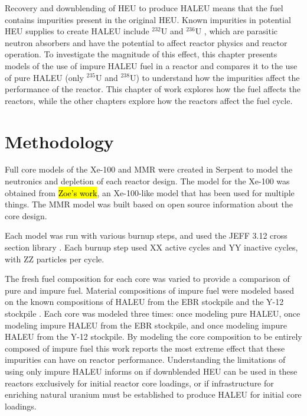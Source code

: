 Recovery and downblending of \gls{HEU} to produce \gls{HALEU} means that 
the fuel contains impurities present in the original
\gls{HEU}. Known impurities in potential \gls{HEU}
supplies to create \gls{HALEU} include $^{232}$U and $^{236}$U
\cite{vaden_isotopic_2018,nelson_foreign_2010},  
which are parasitic neutron absorbers and have the potential to affect 
reactor physics and reactor operation. To investigate the magnitude of this 
effect, this chapter presents models of the use of 
impure \gls{HALEU} fuel in a reactor and compares it to the use of pure 
\gls{HALEU} (only $^{235}$U and $^{238}$U)
to understand how the impurities affect the performance of the reactor.
This chapter of work explores how the fuel affects the reactors, while 
the other chapters explore how the reactors affect the fuel cycle. 

\section{Methodology}
Full core models of the Xe-100 and \gls{MMR} were created in Serpent 
\cite{leppanen_serpent_2014} to model the neutronics and depletion of 
each reactor design. The model for the Xe-100 was obtained from 
\hl{Zoe's work}, an Xe-100-like model that has been used for multiple 
things. The \gls{MMR} model was built based on open source information 
about the core design. 

Each model was run with various burnup steps, and used the JEFF 3.12 
cross section library \cite{koning_status_2011}. Each burnup step 
used XX active cycles and YY inactive cycles, with ZZ particles per 
cycle. 




The fresh fuel composition for each core was varied to provide 
a comparison of pure and impure fuel.
Material compositions of impure fuel were modeled based on the 
known compositions of \gls{HALEU} from the \gls{EBR} stockpile 
\cite{vaden_isotopic_2018} and the Y-12 stockpile \cite{nelson_foreign_2010}.
Each core was modeled three times: once modeling pure \gls{HALEU}, 
once modeling impure \gls{HALEU} from the \gls{EBR} stockpile, and once 
modeling impure \gls{HALEU} from the Y-12 stockpile.
By modeling the core composition to be entirely composed of impure fuel 
this work reports the most extreme effect that these impurities can 
have on reactor performance. Understanding the limitations of using only 
impure \gls{HALEU} informs on if downblended \gls{HEU} can be used in 
these reactors exclusively for initial reactor core loadings, or if 
infrastructure for enriching natural uranium must be established to 
produce \gls{HALEU} for initial core loadings. 

